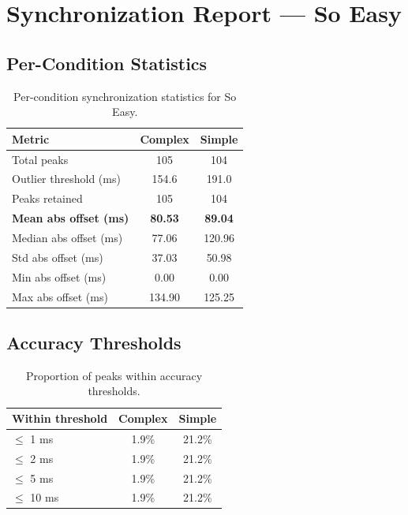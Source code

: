 
\section*{Synchronization Report --- So Easy}

\subsection*{Per-Condition Statistics}

\begin{table}[h!]
\centering
\begin{tabular}{|l|c|c|}
\hline
Metric & Complex & Simple \\
\hline
Total peaks & 105 & 104 \\
Outlier threshold (ms) & 154.6 & 191.0 \\
Peaks retained & 105 & 104 \\
\textbf{Mean abs offset (ms)} & \textbf{80.53} & \textbf{89.04} \\
Median abs offset (ms) & 77.06 & 120.96 \\
Std abs offset (ms) & 37.03 & 50.98 \\
Min abs offset (ms) & 0.00 & 0.00 \\
Max abs offset (ms) & 134.90 & 125.25 \\
\hline
\end{tabular}
\caption{Per-condition synchronization statistics for So Easy.}
\label{tab:sync_stats}
\end{table}

\subsection*{Accuracy Thresholds}

\begin{table}[h!]
\centering
\begin{tabular}{|l|c|c|}
\hline
Within threshold & Complex & Simple \\
\hline
$\leq$ 1 ms & 1.9\% & 21.2\% \\
$\leq$ 2 ms & 1.9\% & 21.2\% \\
$\leq$ 5 ms & 1.9\% & 21.2\% \\
$\leq$ 10 ms & 1.9\% & 21.2\% \\
\hline
\end{tabular}
\caption{Proportion of peaks within accuracy thresholds.}
\label{tab:sync_accuracy}
\end{table}

